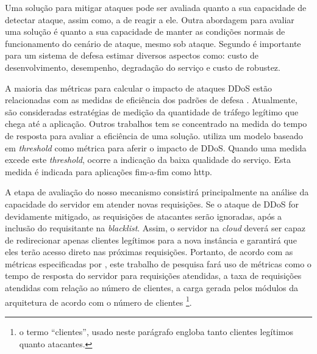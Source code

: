 

%
Uma solução para mitigar ataques pode ser avaliada quanto a sua capacidade de detectar ataque, assim como, a de reagir a ele. Outra abordagem para avaliar uma solução é quanto a sua capacidade de manter as condições normais de funcionamento do cenário de ataque, mesmo sob ataque. Segundo \cite{4600003} é importante para um sistema de defesa estimar diversos aspectos como: custo de desenvolvimento, desempenho, degradação do serviço e custo de robustez. 

A maioria das métricas para calcular o impacto de ataques DDoS estão relacionadas com as medidas de eficiência dos padrões de defesa \cite{4809152}. Atualmente, são consideradas estratégias de medição da quantidade de tráfego legítimo que chega até a aplicação. Outros trabalhos tem se concentrado na medida do tempo de resposta para avaliar a eficiência de uma solução. \cite{Mirkovic:2007:TUM:1281700.1281708} utiliza um modelo baseado em \emph{threshold} como métrica para aferir o impacto de DDoS. Quando uma medida excede este \emph{threshold}, ocorre a  indicação da baixa qualidade do serviço. Esta medida é indicada para aplicações fim-a-fim como http.


A etapa de avaliação do nosso mecanismo consistirá principalmente na análise
da capacidade do servidor em atender novas requisições. Se o ataque de DDoS for devidamente
mitigado, as requisições de atacantes serão ignoradas, após a inclusão do requisitante na \emph{blacklist}. Assim, o servidor na \emph{cloud} deverá ser capaz de redirecionar apenas clientes legítimos 
para a nova instância e garantirá que eles terão acesso direto nas próximas requisições. %
Portanto, de acordo com as métricas especificadas por \cite{4600003}, este trabalho de pesquisa fará uso de métricas como o tempo de resposta do servidor para requisições atendidas, a taxa de requisições atendidas com relação ao número de clientes, a carga gerada pelos módulos da arquitetura de acordo com o número de clientes \footnote{o termo ``clientes'', usado neste parágrafo engloba tanto clientes legítimos quanto atacantes.}. 

